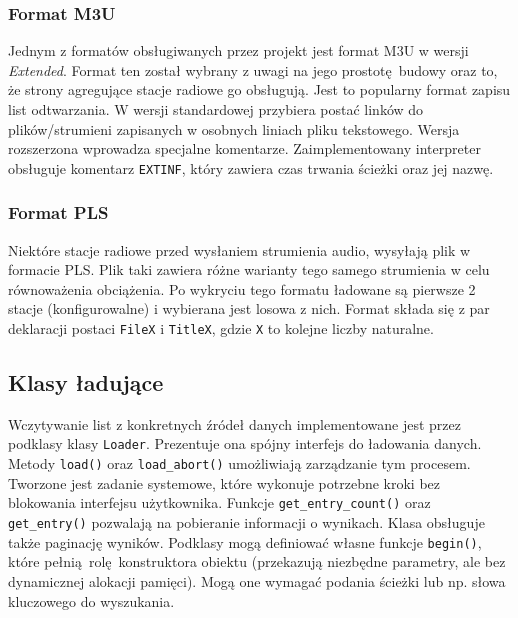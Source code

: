\documentclass[12pt]{report}
\begin{document}
			\subsubsection{Format M3U}
				Jednym z formatów obsługiwanych przez projekt jest format M3U\textsuperscript{\cite{m3u}} w wersji \textit{Extended}. Format ten został wybrany z uwagi na jego prostotę budowy oraz to, że strony agregujące stacje radiowe go obsługują. Jest to popularny format zapisu list odtwarzania. W wersji standardowej przybiera postać linków do plików/strumieni zapisanych w osobnych liniach pliku tekstowego. Wersja rozszerzona wprowadza specjalne komentarze. Zaimplementowany interpreter obsługuje komentarz \lstinline|EXTINF|, który zawiera czas trwania ścieżki oraz jej nazwę.
			
			\subsubsection{Format PLS}
				Niektóre stacje radiowe przed wysłaniem strumienia audio, wysyłają plik w formacie PLS\textsuperscript{\cite{pls}}. Plik taki zawiera różne warianty tego samego strumienia w celu równoważenia obciążenia. Po wykryciu tego formatu ładowane są pierwsze 2 stacje (konfigurowalne) i wybierana jest losowa z nich. Format składa się z par deklaracji postaci \lstinline|FileX| i \lstinline|TitleX|, gdzie \lstinline|X| to kolejne liczby naturalne.
			
		\subsection{Klasy ładujące}
			Wczytywanie list z konkretnych źródeł danych implementowane jest przez podklasy klasy \lstinline|Loader|. Prezentuje ona spójny interfejs do ładowania danych. Metody \lstinline|load()| oraz \lstinline|load_abort()| umożliwiają zarządzanie tym procesem. Tworzone jest zadanie systemowe, które wykonuje potrzebne kroki bez blokowania interfejsu użytkownika. Funkcje \lstinline|get_entry_count()| oraz \lstinline|get_entry()| pozwalają na pobieranie informacji o wynikach. Klasa obsługuje także paginację wyników. Podklasy mogą definiować własne funkcje \lstinline|begin()|, które pełnią rolę konstruktora obiektu (przekazują niezbędne parametry, ale bez dynamicznej alokacji pamięci). Mogą one wymagać podania ścieżki lub np. słowa kluczowego do wyszukania.
			
\end{document}
